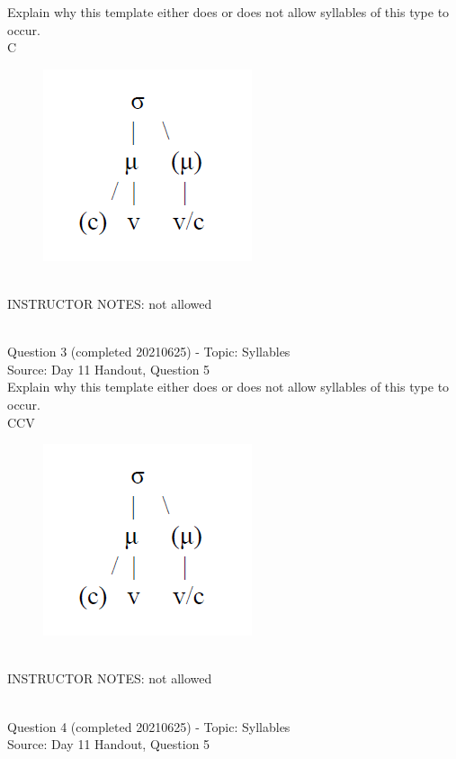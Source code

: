 \documentclass[12pt]{article}
\begin{document}
Explain why this template either does or does not allow syllables of this type to occur.\\

C

\begin{figure}[H]
\includegraphics{../images/ponapean_syllabletemplate.png}
\end{figure}

~\\
INSTRUCTOR NOTES: not allowed


~\\

{\large Question 3} (completed 20210625) - Topic: Syllables\\
Source: Day 11 Handout, Question 5\\

Explain why this template either does or does not allow syllables of this type to occur.\\

CCV

\begin{figure}[H]
\includegraphics{../images/ponapean_syllabletemplate.png}
\end{figure}

~\\
INSTRUCTOR NOTES: not allowed


~\\

{\large Question 4} (completed 20210625) - Topic: Syllables\\
Source: Day 11 Handout, Question 5\\
\end{document}
